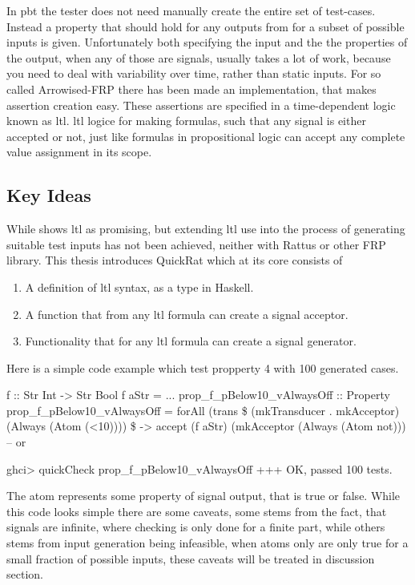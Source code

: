\par In \acrshort{pbt} the tester does not need manually create the entire set of test-cases. Instead a property that should hold for any outputs from for a subset of possible inputs is given. Unfortunately both specifying the input and the the properties of the output, when any of those are signals, usually takes a lot of work, because you need to deal with variability over time, rather than static inputs. For so called Arrowised-FRP there has been made an implementation\parencite{runtimeVerification}, that makes assertion creation easy. These assertions are specified in a time-dependent logic known as \acrfull{ltl}. \acrshort{ltl} logice for making formulas, such that any signal is either accepted or not, just like formulas in propositional logic can accept any complete value assignment in its scope.

\subsection{Key Ideas}
\par While \parencite{runtimeVerification,quickstrom} shows \acrshort{ltl} as promising, but extending \acrshort{ltl} use into the process of generating suitable test inputs has not been achieved, neither with Rattus or other FRP library. This thesis introduces QuickRat which at its core consists of
\begin{enumerate}
    \item A definition of  \acrshort{ltl} syntax, as a type in Haskell.
    \item A function that from any  \acrshort{ltl} formula can create a signal acceptor.
    \item Functionality that for any  \acrshort{ltl} formula can create a signal generator.
\end{enumerate}
Here is a simple code example which test propperty 4 with 100 generated cases.
\begin{hscode}
f :: Str Int -> Str Bool
f aStr = ...
prop_f_pBelow10_vAlwaysOff :: Property
prop_f_pBelow10_vAlwaysOff =
    forAll
        (trans \$ (mkTransducer . mkAcceptor) (Always (Atom (<10))))
        \$ \aStr -> accept (f aStr) (mkAcceptor (Always (Atom not)))
    -- or
    
ghci> quickCheck prop_f_pBelow10_vAlwaysOff
\>\>\> +++ OK, passed 100 tests.
\end{hscode}
The atom represents some property of signal output, that is true or false. While this code looks simple there are some caveats, some stems from the fact, that signals are infinite, where checking is only done for a finite part, while others stems from input generation being infeasible, when atoms only are only true for a small fraction of possible inputs, these caveats will be treated in discussion section.
